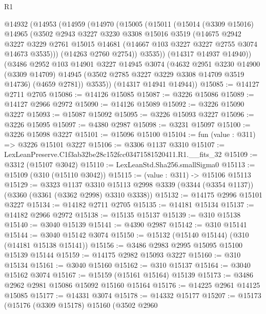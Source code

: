 \begin{lexlean}{R1}
\begin{coremodule}
  @14932
    (@14953
      (@14959
        (@14970
          (@15005
            (@15011
              (@15014
                (@3309 @15016)
                @14965
                (@3502
                  @2943
                  @3227
                  @3230
                  @3308
                  @15016
                  @3519
                  (@14675
                    @2942
                    @3227
                    @3229
                    @2761
                    @15015
                    @14681
                    (@14667 @103 @3227 @3227 @2755 @3074 @14673 @3535)))
                (@14263 @2760 @2754))
              @3535))
          (@14317 @14937 @14940))
        (@3486
          @2952
          @103
          @14901
          @3227
          @14945
          @3074
          (@4632
            @2951
            @3230
            @14900
            (@3309 @14709)
            @14945
            (@3502 @2785 @3227 @3229 @3308 @14709 @3519 @14736)
            (@4659 @2781))
          @3535))
      (@14317 @14941 @14944))
@15085 := @14127 @2711 @2705
@15086 := @14126 @15085
@15087 := @3226 @15086
@15089 := @14127 @2966 @2972
@15090 := @14126 @15089
@15092 := @3226 @15090 @3227
@15093 := @15087 @15092
@15095 := @3226 @15093 @3227
@15096 := @3226 @15095
@15097 := @4380 @2987
@15098 := @3231 @15097
@15100 := @3226 @15098 @3227
@15101 := @15096 @15100
@15104 := fun (value : @311) => @3226 @15101 @3227
@15106 := @3306 @1137 @3310
@15107 := LexLeanPreserve.C1f3ab32be28c152fcc03471581520411.R1.__fits_32
@15109 := @3312 (@15107 @3042)
@15110 := LexLeanStd.Sha256.smallSigma0
@15113 := @15109 (@310 (@15110 @3042))
@15115 := (value : @311) -> @15106 @15113
@15129 := @3323
    @1137
    @3310
    @15113
    @2998
    @3339
    (@3344 (@3354 @1137))
    (@3360 (@3361 (@3362 @2998) @3310 @3338))
@15132 := @14175 @2996 @15101 @3227
@15134 := @14182 @2711 @2705
@15135 := @14181 @15134
@15137 := @14182 @2966 @2972
@15138 := @15135 @15137
@15139 := @310 @15138
@15140 := @3040 @15139
@15141 := @4390 @2987
@15142 := @310 @15141
@15144 := @3040 @15142 @3074
@15150 := @15132 (@15140 @15144) (@310 (@14181 @15138 @15141))
@15156 := @3486 @2983 @2995 @15095 @15100 @15139 @15144
@15159 := @14175 @2982 @15093 @3227
@15160 := @310 @15134
@15161 := @3040 @15160
@15162 := @310 @15137
@15164 := @3040 @15162 @3074
@15167 := @15159 (@15161 @15164) @15139
@15173 := @3486 @2962 @2981 @15086 @15092 @15160 @15164
@15176 := @14225 @2961 @14125 @15085
@15177 := @14331 @3074
@15178 := @14332 @15177
@15207 := @15173
    (@15176
      (@3309 @15178)
      @15160
      (@3502
        @2960

\end{coremodule}
\end{lexlean}
